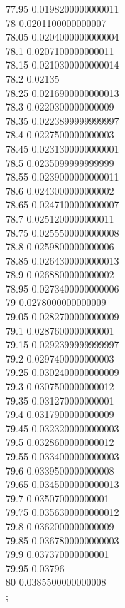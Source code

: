 {77.95	0.0198200000000011\\
78	0.0201100000000007\\
78.05	0.0204000000000004\\
78.1	0.0207100000000011\\
78.15	0.0210300000000014\\
78.2	0.02135\\
78.25	0.0216900000000013\\
78.3	0.0220300000000009\\
78.35	0.0223899999999997\\
78.4	0.0227500000000003\\
78.45	0.0231300000000001\\
78.5	0.0235099999999999\\
78.55	0.0239000000000011\\
78.6	0.0243000000000002\\
78.65	0.0247100000000007\\
78.7	0.0251200000000011\\
78.75	0.0255500000000008\\
78.8	0.0259800000000006\\
78.85	0.0264300000000013\\
78.9	0.0268800000000002\\
78.95	0.0273400000000006\\
79	0.0278000000000009\\
79.05	0.0282700000000009\\
79.1	0.0287600000000001\\
79.15	0.0292399999999997\\
79.2	0.0297400000000003\\
79.25	0.0302400000000009\\
79.3	0.0307500000000012\\
79.35	0.031270000000001\\
79.4	0.0317900000000009\\
79.45	0.0323200000000003\\
79.5	0.0328600000000012\\
79.55	0.0334000000000003\\
79.6	0.0339500000000008\\
79.65	0.0345000000000013\\
79.7	0.035070000000001\\
79.75	0.0356300000000012\\
79.8	0.0362000000000009\\
79.85	0.0367800000000003\\
79.9	0.037370000000001\\
79.95	0.03796\\
80	0.0385500000000008\\
};
